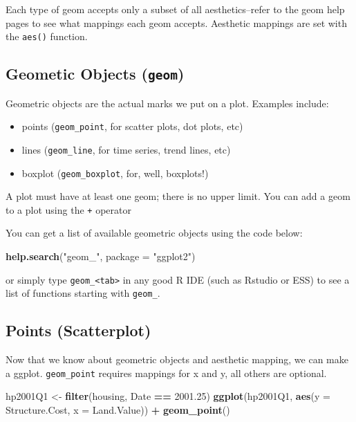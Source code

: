 \documentclass[]{book}
\newenvironment{Shaded}{\begin{snugshade}}{\end{snugshade}}
\newcommand{\KeywordTok}[1]{\textcolor[rgb]{0.13,0.29,0.53}{\textbf{#1}}}
\newcommand{\DataTypeTok}[1]{\textcolor[rgb]{0.13,0.29,0.53}{#1}}
\newcommand{\FloatTok}[1]{\textcolor[rgb]{0.00,0.00,0.81}{#1}}
\newcommand{\StringTok}[1]{\textcolor[rgb]{0.31,0.60,0.02}{#1}}
\newcommand{\OperatorTok}[1]{\textcolor[rgb]{0.81,0.36,0.00}{\textbf{#1}}}
\newcommand{\NormalTok}[1]{#1}
\providecommand{\tightlist}{%
  \setlength{\itemsep}{0pt}\setlength{\parskip}{0pt}}
\begin{document}
Each type of geom accepts only a subset of all aesthetics--refer to the
geom help pages to see what mappings each geom accepts. Aesthetic
mappings are set with the \texttt{aes()} function.

\subsection{\texorpdfstring{Geometic Objects
(\texttt{geom})}{Geometic Objects (geom)}}\label{geometic-objects-geom}

Geometric objects are the actual marks we put on a plot. Examples
include:

\begin{itemize}
\tightlist
\item
  points (\texttt{geom\_point}, for scatter plots, dot plots, etc)
\item
  lines (\texttt{geom\_line}, for time series, trend lines, etc)
\item
  boxplot (\texttt{geom\_boxplot}, for, well, boxplots!)
\end{itemize}

A plot must have at least one geom; there is no upper limit. You can add
a geom to a plot using the \texttt{+} operator

You can get a list of available geometric objects using the code below:

\begin{Shaded}
\begin{Highlighting}[]
\KeywordTok{help.search}\NormalTok{(}\StringTok{"geom_"}\NormalTok{, }\DataTypeTok{package =} \StringTok{"ggplot2"}\NormalTok{)}
\end{Highlighting}
\end{Shaded}

or simply type \texttt{geom\_\textless{}tab\textgreater{}} in any good R
IDE (such as Rstudio or ESS) to see a list of functions starting with
\texttt{geom\_}.

\subsection{Points (Scatterplot)}\label{points-scatterplot}

Now that we know about geometric objects and aesthetic mapping, we can
make a ggplot. \texttt{geom\_point} requires mappings for x and y, all
others are optional.

\begin{Shaded}
\begin{Highlighting}[]
\NormalTok{hp2001Q1 <-}\StringTok{ }\KeywordTok{filter}\NormalTok{(housing, Date }\OperatorTok{==}\StringTok{ }\FloatTok{2001.25}\NormalTok{) }
\KeywordTok{ggplot}\NormalTok{(hp2001Q1,}
       \KeywordTok{aes}\NormalTok{(}\DataTypeTok{y =}\NormalTok{ Structure.Cost, }\DataTypeTok{x =}\NormalTok{ Land.Value)) }\OperatorTok{+}
\StringTok{  }\KeywordTok{geom_point}\NormalTok{()}
\end{Highlighting}
\end{Shaded}
\end{document}
